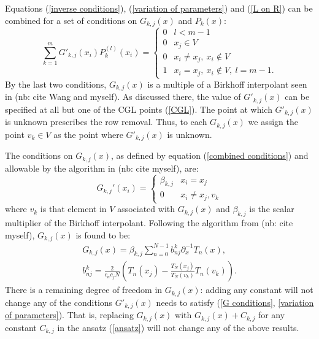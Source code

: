 \documentclass{article}
\begin{document}
Equations (\ref{inverse conditions}), (\ref{variation of parameters}) and (\ref{L on R}) can be combined for a set of conditions on $G_{k,j}(x)$ and $P_k(x)$:
\begin{equation} \label{combined conditions}
\sum_{k=1}^m G'_{k,j}(x_i) P_k^{(l)}(x_i) = \begin{cases} 0 & l < m-1 \\
0 & x_j \in V \\
0 & x_i \neq x_j, \ x_i \notin V \\
1 & x_i = x_j, \ x_i \notin V , \ l = m-1.\end{cases} 
\end{equation}
By the last two conditions, $G_{k,j}(x)$ is a multiple of a Birkhoff interpolant seen in (nb: cite Wang and myself). %
As discussed there, the value of $G'_{k,j}(x)$ can be specified at all but one of the CGL points (\ref{CGL}).
The point at which $G'_{k,j}(x)$ is unknown prescribes the row removal.
Thus, to each $G_{k,j}(x)$ we assign the point $v_k \in V$ as the point where $G'_{k,j}(x)$ is unknown.

The conditions on $G_{k,j}(x)$, as defined by equation (\ref{combined conditions}) and allowable by the algorithm in (nb: cite myself), are:
\begin{equation} \label{G conditions}
G_{k,j}'(x_i) = \begin{cases} \beta_{k,j} & x_i = x_j \\ 0 & x_i \neq x_j, v_k \end{cases}
\end{equation}
where $v_k$ is that element in $V$ associated with $G_{k,j}(x)$
and $\beta_{k,j}$ is the scalar multiplier of the Birkhoff interpolant.
Following the algorithm from (nb: cite myself), $G_{k,j}(x)$ is found to be:
\begin{equation} \label{eq:G functions}
\begin{gathered}
G_{k,j} (x) = \beta_{k,j} \sum_{n=0}^{N-1} b^k_{nj} \partial_x^{-1} T_n(x), \\
 b^k_{nj} = \frac{2}{c_n c_j N} \left ( T_n(x_j) - \frac{T_N(x_j)}{T_N(v_k)} T_n(v_k) \right ).
\end{gathered}
\end{equation}
There is a remaining degree of freedom in $G_{k,j}(x)$: 
adding any constant will not change any of the conditions $G'_{k,j}(x)$ needs to satisfy (\ref{G conditions}, \ref{variation of parameters}).
That is, replacing $G_{k,j}(x)$ with $G_{k,j}(x) + C_{k,j}$ for any constant $C_{k,j}$ in the ansatz (\ref{ansatz}) will not change any of the above results.
\end{document}
